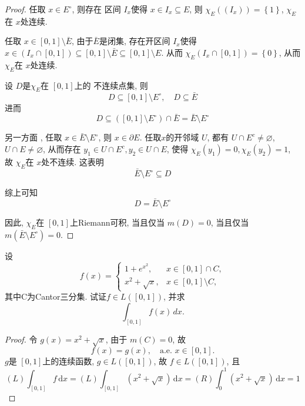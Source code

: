 \documentclass[../main.tex]{subfiles}
\begin{document}
\begin{proof}
    任取 \(  x\in E^{\circ }  \), 则存在 区间 \(  I_{x}  \)使得 \(  x\in I_{x}\subseteq E  \), 则 \(  \chi _{E}\left( \left( I_{x} \right)  \right)=   \left\{ 1 \right\}  \), \(  \chi _{E}  \)在 \(  x  \)处连续.     

    任取 \(  x\in [0,1]\setminus \bar{E}  \), 由于\(  \bar{E}  \)是闭集,  存在开区间 \(  I_{x}  \)使得 \(  x\in \left( I_{x}\cap [0,1] \right)\subseteq   [0,1]\setminus \bar{E}\subseteq [0,1]\setminus E \).  从而 \(  \chi _{E}\left( I_{x}\cap [0,1] \right)= \left\{ 0 \right\}  \), 从而 \(  \chi _{E}  \)在 \(  x  \)处连续.    

    设 \(  D  \)是\(  \chi _{E} \)在 \(  \left[ 0,1 \right]   \)上的 不连续点集, 则 \[
    D\subseteq [0,1]\setminus E^{\circ},\quad D\subseteq \bar{E}
    \]  进而 \[
    D\subseteq \left( [0,1]\setminus E^{\circ} \right)\cap \bar{E}= \bar{E}\setminus E^{\circ} 
    \]

    另一方面 , 任取 \(  x\in \bar{E}\setminus E^{\circ}  \), 则 \(  x\in  \partial E  \). 任取\(  x  \)的开邻域 \(  U  \), 都有 \(  U\cap E^{c}\neq \varnothing  \), \(  U\cap E\neq \varnothing  \), 从而存在 \(  y_1\in U\cap E^{c}, y_2\in U\cap E  \), 使得 \(  \chi _{E}\left( y_1 \right)= 0, \chi _{E}\left( y_2 \right)= 1    \), 故 \(  \chi _{E}  \)在 \(  x  \)处不连续. 这表明 \[
    \bar{E}\setminus E^{\circ}\subseteq D
    \]     
    
    综上可知 \[
    D= \bar{E}\setminus E^{\circ}
    \]

    因此, \(  \chi _{E}  \)在 \(  \left[ 0,1 \right]   \)上Riemann可积, 当且仅当 \(  m\left( D \right)= 0   \), 当且仅当 \(  m\left( \bar{E}\setminus E^{\circ} \right)= 0   \).    
    
    

\end{proof}
\begin{exercise}{}{}
设
\[
f(x)=
\begin{cases}
1+e^{x^{2}}, & x\in[0,1]\cap C,\\
x^{2}+\sqrt{x}, & x\in[0,1]\setminus C,
\end{cases}
\]
其中C为Cantor三分集. 试证\(f\in L([0,1])\), 并求
\[
\int_{[0,1]} f(x)\,dx.
\]
\end{exercise}

\begin{proof}
    令 $g(x) = x^2 + \sqrt{x}$, 
由于 $m(C)=0$, 故
$$f(x) = g(x), \quad \text{a.e. } x \in [0,1].$$ \(  g  \)是 \(  \left[ 0,1 \right]   \)上的连续函数, \(  g\in L\left( \left[ 0,1 \right]  \right)   \), 故 \(  f\in L\left( \left[ 0,1 \right]  \right)   \), 且\[
    \left( L \right)\int_{\left[ 0,1 \right] }f\,\mathrm{d} x= \left( L \right)\int_{[0,1]}\left( x^{2}+ \sqrt{x} \right)\,\mathrm{d} x   = \left( R \right)\int_{0}^{1}\left( x^{2}+ \sqrt{x} \right)\,\mathrm{d} x= 1  
    \]   


\end{proof}
\end{document}
